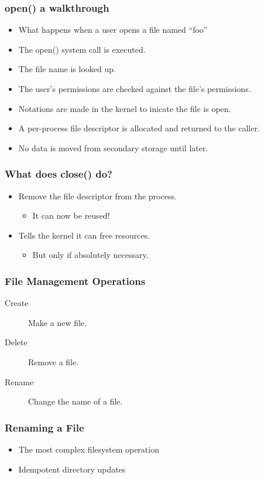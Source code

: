 \documentclass[pdftex]{beamer} %
\begin{document}
\begin{frame}
  \frametitle{open() a walkthrough}
  \begin{itemize}
  \item What happens when a user opens a file named ``foo''
  \item The open() system call is executed.
  \item The file name is looked up.
  \item The user's permissions are checked against the file's
    permissions.
  \item Notations are made in the kernel to inicate the file is open.
  \item A per-process file descriptor is allocated and returned to the
    caller.
  \item No data is moved from secondary storage until later.
  \end{itemize}
\end{frame}

\begin{frame}
  \frametitle{What does close() do?}
  \begin{itemize}
  \item Remove the file descriptor from the process.
    \begin{itemize}
    \item It can now be reused!
    \end{itemize}
  \item Tells the kernel it can free resources.
    \begin{itemize}
    \item But only if absolutely necessary.
    \end{itemize}
  \end{itemize}
\end{frame}

\begin{frame}
  \frametitle{File Management Operations}
  \begin{description}
  \item[Create] Make a new file.
  \item[Delete] Remove a file.
  \item[Rename] Change the name of a file.
  \end{description}
\end{frame}

\begin{frame}
  \frametitle{Renaming a File}
  \begin{itemize}
  \item The most complex filesystem operation
  \item Idempotent directory updates
  \end{itemize}
\end{frame}
\end{document}
